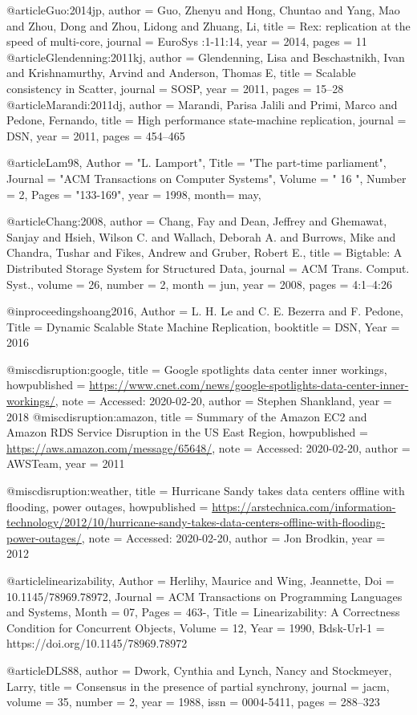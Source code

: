 @article{Guo:2014jp,
author    = {Guo, Zhenyu and Hong, Chuntao and Yang, Mao and Zhou, Dong and Zhou, Lidong and Zhuang, Li},
title     = {{Rex: replication at the speed of multi-core}},
journal   = {EuroSys :1-11:14},
year      = {2014},
pages     = {11}
}
@article{Glendenning:2011kj,
author    = {Glendenning, Lisa and Beschastnikh, Ivan and Krishnamurthy, Arvind and Anderson, Thomas E},
title     = {{Scalable consistency in Scatter}},
journal   = {SOSP},
year      = {2011},
pages     = {15--28}
}
@article{Marandi:2011dj,
author    = {Marandi, Parisa Jalili and Primi, Marco and Pedone, Fernando},
title     = {{High performance state-machine replication}},
journal   = {DSN},
year      = {2011},
pages     = {454--465}
}

@article{Lam98,
  Author = "L. Lamport",
  Title = "The part-time parliament",
  Journal = "ACM Transactions on Computer Systems",
  Volume = " 16 ",
  Number = 2,
  Pages = "133-169",
  year = 1998,
month= may,
}

@article{Chang:2008,
 author = {Chang, Fay and Dean, Jeffrey and Ghemawat, Sanjay and Hsieh, Wilson C. and Wallach, Deborah A. and Burrows, Mike and Chandra, Tushar and Fikes, Andrew and Gruber, Robert E.},
 title = {Bigtable: A Distributed Storage System for Structured Data},
 journal = {ACM Trans. Comput. Syst.},
 volume = {26},
 number = {2},
 month = jun,
 year = {2008},
 pages = {4:1--4:26}
}

@inproceedings{hoang2016,
Author    = {L. H. Le and C. E. Bezerra and F. Pedone},
Title     = {Dynamic Scalable State Machine Replication},
booktitle   = {DSN},
Year      = {2016}
}

@misc{disruption:google,
  title = {Google spotlights data center inner workings},
  howpublished = {\url{https://www.cnet.com/news/google-spotlights-data-center-inner-workings/}},
  note = {Accessed: 2020-02-20},
  author = {Stephen Shankland},
  year      = {2018}
}
@misc{disruption:amazon,
  title = {Summary of the Amazon EC2 and Amazon RDS Service Disruption in the US East Region},
  howpublished = {\url{https://aws.amazon.com/message/65648/}},
  note = {Accessed: 2020-02-20},
  author = {AWS{}Team},
  year      = {2011}
}

@misc{disruption:weather,
  title = {Hurricane Sandy takes data centers offline with flooding, power outages},
  howpublished = {\url{https://arstechnica.com/information-technology/2012/10/hurricane-sandy-takes-data-centers-offline-with-flooding-power-outages/}},
  note = {Accessed: 2020-02-20},
  author = {Jon Brodkin},
  year      = {2012}
}

@article{linearizability,
	Author = {Herlihy, Maurice and Wing, Jeannette},
	Doi = {10.1145/78969.78972},
	Journal = {ACM Transactions on Programming Languages and Systems},
	Month = {07},
	Pages = {463-},
	Title = {Linearizability: A Correctness Condition for Concurrent Objects},
	Volume = {12},
	Year = {1990},
	Bdsk-Url-1 = {https://doi.org/10.1145/78969.78972}
   }


@article{DLS88,
 author = {Dwork, Cynthia and Lynch, Nancy and Stockmeyer, Larry},
 title = {Consensus in the presence of partial synchrony},
 journal = jacm,
 volume = {35},
 number = {2},
 year = {1988},
 issn = {0004-5411},
 pages = {288--323}
}